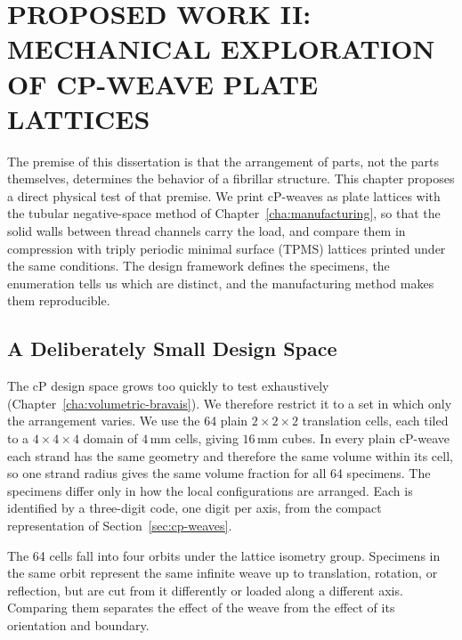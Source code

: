 %
%

\chapter{\uppercase{Proposed Work II: Mechanical Exploration of cP-Weave Plate Lattices}}
\label{cha:mechanical}

The premise of this dissertation is that the arrangement of parts, not the parts themselves, determines the behavior of a fibrillar structure. This chapter proposes a direct physical test of that premise. We print cP-weaves as plate lattices with the tubular negative-space method of Chapter~\ref{cha:manufacturing}, so that the solid walls between thread channels carry the load, and compare them in compression with triply periodic minimal surface (TPMS) lattices printed under the same conditions. The design framework defines the specimens, the enumeration tells us which are distinct, and the manufacturing method makes them reproducible.

\section{A Deliberately Small Design Space}
\label{sec:mech-designspace}

The cP design space grows too quickly to test exhaustively (Chapter~\ref{cha:volumetric-bravais}). We therefore restrict it to a set in which only the arrangement varies. We use the 64 plain $2\times2\times2$ translation cells, each tiled to a $4\times4\times4$ domain of $4\,\mathrm{mm}$ cells, giving $16\,\mathrm{mm}$ cubes. In every plain cP-weave each strand has the same geometry and therefore the same volume within its cell, so one strand radius gives the same volume fraction for all 64 specimens. The specimens differ only in how the local configurations are arranged. Each is identified by a three-digit code, one digit per axis, from the compact representation of Section~\ref{sec:cp-weaves}.

The 64 cells fall into four orbits under the lattice isometry group. Specimens in the same orbit represent the same infinite weave up to translation, rotation, or reflection, but are cut from it differently or loaded along a different axis. Comparing them separates the effect of the weave from the effect of its orientation and boundary.

